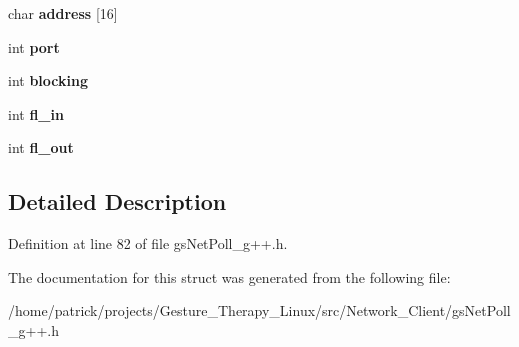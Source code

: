 \begin{DoxyCompactItemize}
char {\bfseries address} \mbox{[}16\mbox{]}
\item 
\mbox{\label{structgs_net_poll_struct_a26c144f92851aad77a6c7771e4377786}} 
int {\bfseries port}
\item 
\mbox{\label{structgs_net_poll_struct_ae0a2536d19bfcf0eeb2d7bbc85cd648e}} 
int {\bfseries blocking}
\item 
\mbox{\label{structgs_net_poll_struct_a21d987edcbbaf0e308a8b0f89d7b7eb1}} 
int {\bfseries fl\+\_\+in}
\item 
\mbox{\label{structgs_net_poll_struct_ae02b218aeb9fb585da75abf23490903c}} 
int {\bfseries fl\+\_\+out}
\end{DoxyCompactItemize}


\subsection{Detailed Description}


Definition at line 82 of file gs\+Net\+Poll\+\_\+g++.\+h.



The documentation for this struct was generated from the following file\+:\begin{DoxyCompactItemize}
\item 
/home/patrick/projects/\+Gesture\+\_\+\+Therapy\+\_\+\+Linux/src/\+Network\+\_\+\+Client/gs\+Net\+Poll\+\_\+g++.\+h\end{DoxyCompactItemize}

